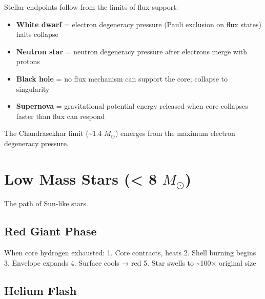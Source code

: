 \documentclass[
  11pt,
  letterpaper,
  twoside,
  openright]{book}
\providecommand{\tightlist}{%
  \setlength{\itemsep}{0pt}\setlength{\parskip}{0pt}}
\begin{document}
\begin{tcolorbox}[enhanced jigsaw, coltitle=black, colbacktitle=quarto-callout-note-color!10!white, toprule=.15mm, colframe=quarto-callout-note-color-frame, arc=.35mm, opacityback=0, bottomtitle=1mm, toptitle=1mm, breakable, colback=white, titlerule=0mm, opacitybacktitle=0.6, title=\textcolor{quarto-callout-note-color}{\faInfo}\hspace{0.5em}{How FTD Produces Stellar Death}, rightrule=.15mm, bottomrule=.15mm, leftrule=.75mm, left=2mm]

Stellar endpoints follow from the limits of flux support:

\begin{itemize}
\tightlist
\item
  \textbf{White dwarf} = electron degeneracy pressure (Pauli exclusion
  on flux states) halts collapse
\item
  \textbf{Neutron star} = neutron degeneracy pressure after electrons
  merge with protons
\item
  \textbf{Black hole} = no flux mechanism can support the core; collapse
  to singularity
\item
  \textbf{Supernova} = gravitational potential energy released when core
  collapses faster than flux can respond
\end{itemize}

The Chandrasekhar limit (\textasciitilde1.4 \(M_\odot\)) emerges from
the maximum electron degeneracy pressure.

\end{tcolorbox}

\section{\texorpdfstring{Low Mass Stars (\textless{} 8
\(M_\odot\))}{Low Mass Stars (\textless{} 8 M\_\textbackslash odot)}}\label{low-mass-stars-8-m_odot}

The path of Sun-like stars.

\subsection{Red Giant Phase}\label{red-giant-phase}

When core hydrogen exhausted: 1. Core contracts, heats 2. Shell burning
begins 3. Envelope expands 4. Surface cools → red 5. Star swells to
\textasciitilde100× original size

\subsection{Helium Flash}\label{helium-flash}
\end{document}
